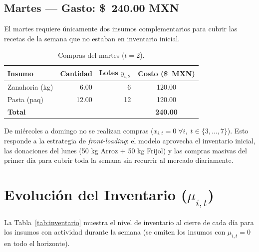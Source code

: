 \documentclass[12pt, a4paper]{article}
\begin{document}
\subsection{Martes — Gasto: \$~240.00 MXN}

El martes requiere únicamente dos insumos complementarios para cubrir
las recetas de la semana que no estaban en inventario inicial.

\begin{table}[h!]
\centering
\renewcommand{\arraystretch}{1.25}
\begin{tabular}{lrrc}
\toprule
\textbf{Insumo} & \textbf{Cantidad} & \textbf{Lotes $y_{i,2}$} & \textbf{Costo (\$~MXN)} \\
\midrule
Zanahoria (kg) & 6.00 & 6  & 120.00 \\
Pasta (paq)    & 12.00 & 12 & 120.00 \\
\midrule
\textbf{Total} &       &    & \textbf{240.00} \\
\bottomrule
\end{tabular}
\caption{Compras del martes ($t = 2$).}
\label{tab:compras_martes}
\end{table}

\noindent De miércoles a domingo no se realizan compras ($x_{i,t} = 0 \;\forall i,\; t \in \{3,\ldots,7\}$).
Esto responde a la estrategia de \emph{front-loading}: el modelo aprovecha el inventario
inicial, las donaciones del lunes (50 kg Arroz + 50 kg Frijol) y las compras masivas del
primer día para cubrir toda la semana sin recurrir al mercado diariamente.

\section{Evolución del Inventario ($\mu_{i,t}$)}

La Tabla~\ref{tab:inventario} muestra el nivel de inventario al cierre de cada día
para los insumos con actividad durante la semana (se omiten los insumos con $\mu_{i,t} = 0$
en todo el horizonte).
\end{document}

